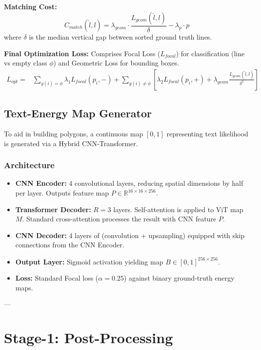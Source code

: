 \documentclass[12pt,a4paper]{article}
\begin{document}
\textbf{Matching Cost:}
\begin{equation}
    C_{match}(\hat{l}, l) = \lambda_{geom} \cdot \frac{L_{geom}(\hat{l}, l)}{\delta} - \lambda_p \cdot p
\end{equation}
where $\delta$ is the median vertical gap between sorted ground truth lines.

\textbf{Final Optimization Loss:}
Comprises Focal Loss ($L_{focal}$) for classification (line vs empty class $\phi$) and Geometric Loss for bounding boxes.
\begin{align}
    L_{opt} = & \sum_{g(i)=\phi} \lambda_1 L_{focal}(p_i, -) + \sum_{g(i)\neq\phi} \left[ \lambda_2 L_{focal}(p_i, +) + \lambda_{geom} \frac{L_{geom}(\hat{l}, l)}{\delta^2} \right]
\end{align}

\subsection{Text-Energy Map Generator}
To aid in building polygons, a continuous map $[0,1]$ representing text likelihood is generated via a Hybrid CNN-Transformer.

\subsubsection{Architecture}
\begin{itemize}
    \item \textbf{CNN Encoder:} 4 convolutional layers, reducing spatial dimensions by half per layer. Outputs feature map $P \in \mathbb{R}^{16 \times 16 \times 256}$.
    \item \textbf{Transformer Decoder:} $R = 3$ layers. Self-attention is applied to ViT map $M$. Standard cross-attention processes the result with CNN feature $P$.
    \item \textbf{CNN Decoder:} 4 layers of (convolution + upsampling) equipped with skip connections from the CNN Encoder.
    \item \textbf{Output Layer:} Sigmoid activation yielding map $B \in [0, 1]^{256 \times 256}$.
    \item \textbf{Loss:} Standard Focal loss ($\alpha=0.25$) against binary ground-truth energy maps.
\end{itemize}

---

\section{Stage-1: Post-Processing}
\end{document}
